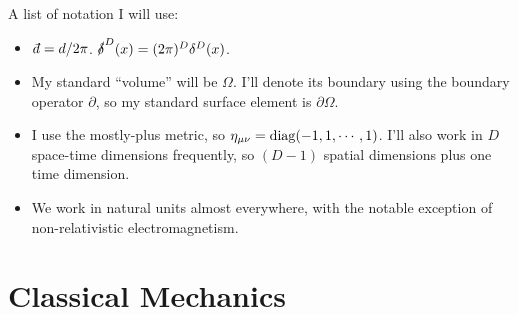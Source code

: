 \documentclass[11pt]{article}
\begin{document}

\begin{reemark}
    A list of notation I will use:
    \begin{itemize}
        \item $\dbar = d/2\pi$. $\sl{\delta}^D(x) = (2\pi)^D \delta^D(x)$.
        \item My standard ``volume'' will be $\Omega$. I'll denote its boundary
        using the boundary operator $\partial$, so my standard surface element
        is $\partial \Omega$.
        \item I use the mostly-plus metric, so $\eta_{\mu \nu} = \diag(-1, 1, \cdots, 1)$.
        I'll also work in $D$ space-time dimensions frequently, so $(D - 1)$
        spatial dimensions plus one time dimension.
        \item We work in natural units almost everywhere, with the notable exception
        of non-relativistic electromagnetism.
    \end{itemize}
\end{reemark}

\newpage
\microtoc
\newpage

\section{Classical Mechanics}
\end{document}
